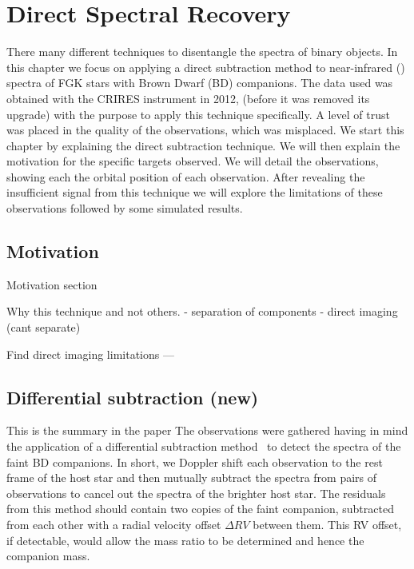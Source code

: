 

\chapter{Direct Spectral Recovery}  %
\label{cha:direct_recovery}
There many different techniques to disentangle the spectra of binary objects. In this chapter we focus on applying a direct subtraction method to near-infrared (\nir{}) spectra of {FGK} stars with Brown Dwarf (BD) companions. The data used was obtained with the {CRIRES} instrument in 2012, (before it was removed its upgrade) with the purpose to apply this technique specifically. A level of trust was placed in the quality of the observations, which was misplaced.
We start this chapter by explaining the direct subtraction technique. We will then explain the motivation for the specific targets observed. We will detail the observations, showing each the orbital position of each observation. After revealing the insufficient signal from this technique we will explore the limitations of these observations followed by some simulated results.

\section{Motivation}


Motivation section

Why this technique and not others.
- separation of components
- direct imaging (cant separate)


Find direct imaging limitations ---



\section{Differential subtraction (new)}
\label{sec:spec_diff}
{\red{} This is the summary in the paper}
The observations were gathered having in mind the application of a differential subtraction method~\citep[e.g.,][]{ferluga_separating_1997, kostogryz_spectral_2013} to detect the spectra of the faint {BD} companions. In short, we Doppler shift each observation to the rest frame of the host star and then mutually subtract the spectra from pairs of observations to cancel out the spectra of the brighter host star. The residuals from this method should contain two copies of the faint companion, subtracted from each other with a radial velocity offset \(\Delta {RV}\) between them. This {RV} offset, if detectable, would allow the mass ratio to be determined and hence the companion mass.

